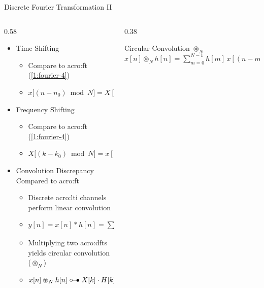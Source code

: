 \begin{frame}{Discrete Fourier Transformation II}
  \begin{columns}[T,onlytextwidth]
    \begin{column}{0.58\textwidth}
      \vspace{0.8em}
      \begin{itemize}
        \item Time Shifting
          \begin{itemize}
            \item Compare to \gls{acro:ft} (\cref{1:fourier-4})
            \item $x\big[(n - n_0) \bmod N\big]= X[k] \, e^{-j \frac{2\pi}{N} k n_0}$
          \end{itemize}
        \item Frequency Shifting
          \begin{itemize}
            \item Compare to \gls{acro:ft} (\cref{1:fourier-4})
            \item $X\big[(k - k_0) \bmod N\big] = x[n] \, e^{j \frac{2\pi}{N} k_0 n}$
          \end{itemize}
        \item Convolution Discrepancy Compared to \gls{acro:ft}
          \begin{itemize}
            \item Discrete \gls{acro:lti} channels perform linear convolution
            \item $y[n] = x[n] * h[n] = \sum_m h[m] x[n - m]$
            \item Multiplying two \gls{acro:dft}s yields circular convolution ($\circledast_N$)
            \item$x[n] \circledast_N h[n] \mathrel{\circ}\mathrel{\!}\mathrel{-}\mathrel{\!}\mathrel{\bullet} X[k] \cdot H[k]$ \\[0.2cm]
          \end{itemize}
      \end{itemize}
    \end{column}
    \begin{column}{0.38\textwidth}
      \begin{block}{Circular Convolution $\circledast_N$}
        \centering
        $x[n] \circledast_N h[n] = \sum_{m=0}^{N-1} h[m] \, x[(n - m) \bmod N]$
      \end{block}
    \end{column}
  \end{columns}
\end{frame}

